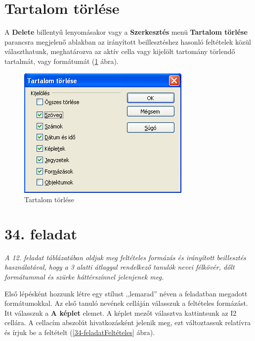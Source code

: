 \section{Tartalom törlése}

A \textbf{Delete} billentyű lenyomásakor vagy a
\textbf{Szerkesztés} menü \textbf{Tartalom törlése} parancsra
megjelenő ablakban az irányított beillesztéshez hasonló
feltételek közül választhatunk, meghatározva az aktív cella
vagy kijelölt tartomány törlendő tartalmát, vagy
formátumát (\ref{TartalomTörlése} ábra).

\begin{figure}[!h]
\begin{center}
\includegraphics[width=8.414cm]{oocalcv1-img161.png}
\caption{Tartalom törlése}\label{TartalomTörlése}
\end{center}
\end{figure}


\section{34. feladat}

{\itshape
A 12. feladat táblázatában oldjuk meg feltételes formázás
és irányított beillesztés használatával, hogy a 3 alatti
átlaggal rendelkező tanulók nevei félkövér, dőlt
formátummal és szürke háttérszínnel jelenjenek meg.}

Első lépésként hozzunk létre egy stílust
,,lemarad'' néven a feladatban
megadott formátumokkal. Az első tanuló nevének celláján
válasszuk a feltételes formázást. Itt válasszuk a \textbf{A
képlet} elemet. A képlet mezőt választva kattintsunk az I2
cellára. A cellacím abszolút hivatkozásként jelenik meg, ezt
változtassuk relatívra és írjuk be a feltételt
(\ref{34-feladatFeltételes} ábra).

